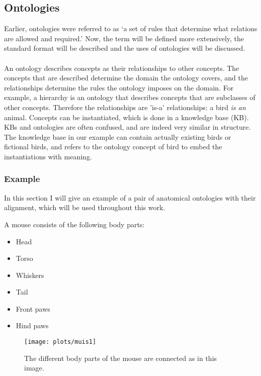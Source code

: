 \documentclass{article}
\begin{document}
 \subsection{Ontologies}
 Earlier, ontologies were referred to as `a set of rules that determine what relations are allowed and required.' Now, the term will be defined more extensively, the standard format will be described and the uses of ontologies will be discussed.
 \paragraph{}
 An ontology describes concepts as their relationships to other concepts. The concepts that are described determine the domain the ontology covers, and the relationships determine the rules the ontology imposes on the domain. For example, a hierarchy is an ontology that describes concepts that are subclasses of other concepts. Therefore the relationships are 'is-a' relationships: a bird \emph{is an} animal.
 Concepts can be instantiated, which is done in a knowledge base (KB). KBs and ontologies are often confused, and are indeed very similar in structure. The knowledge base in our example can contain actually existing birds or fictional birds, and refers to the ontology concept of bird to embed the instantiations with meaning\cite{ontologyGuru}.
 
 \subsubsection{Example} \label{example}
 In this section I will give an example of a pair of anatomical ontologies with their alignment, which will be used throughout this work.
 
\begin{minipage}{0.3\textwidth}
 A mouse consists of the following body parts:
 \begin{itemize}
 \item Head
 \item Torso
 \item Whiskers
 \item Tail
 \item Front paws
 \item Hind paws
 \end{itemize}
\end{minipage} \hfill
\begin{minipage}{0.65\textwidth}
 \begin{figure}[H]
 \texttt{[image: plots/muis1]}
 \label{mouse_example}
 \caption[Mouse ontology]{The different body parts of the mouse are connected as in this image.}
 \end{figure}
\end{minipage}
\end{document}
